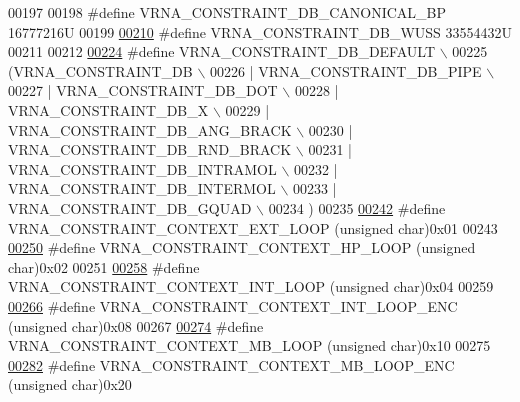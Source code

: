 \begin{DoxyCode}
00197 
00198 \textcolor{preprocessor}{#define VRNA\_CONSTRAINT\_DB\_CANONICAL\_BP         16777216U}
00199 
\hyperlink{group__hard__constraints_ga10ce6bd2355945f3c8161b7a30a2c322}{00210} \textcolor{preprocessor}{#define VRNA\_CONSTRAINT\_DB\_WUSS                 33554432U}
00211 
00212 
\hyperlink{group__hard__constraints_ga1c3864bdc92147a4d93de2b1b4356177}{00224} \textcolor{preprocessor}{#define VRNA\_CONSTRAINT\_DB\_DEFAULT \(\backslash\)}
00225 \textcolor{preprocessor}{  (VRNA\_CONSTRAINT\_DB \(\backslash\)}
00226 \textcolor{preprocessor}{   | VRNA\_CONSTRAINT\_DB\_PIPE \(\backslash\)}
00227 \textcolor{preprocessor}{   | VRNA\_CONSTRAINT\_DB\_DOT \(\backslash\)}
00228 \textcolor{preprocessor}{   | VRNA\_CONSTRAINT\_DB\_X \(\backslash\)}
00229 \textcolor{preprocessor}{   | VRNA\_CONSTRAINT\_DB\_ANG\_BRACK \(\backslash\)}
00230 \textcolor{preprocessor}{   | VRNA\_CONSTRAINT\_DB\_RND\_BRACK \(\backslash\)}
00231 \textcolor{preprocessor}{   | VRNA\_CONSTRAINT\_DB\_INTRAMOL \(\backslash\)}
00232 \textcolor{preprocessor}{   | VRNA\_CONSTRAINT\_DB\_INTERMOL \(\backslash\)}
00233 \textcolor{preprocessor}{   | VRNA\_CONSTRAINT\_DB\_GQUAD \(\backslash\)}
00234 \textcolor{preprocessor}{  )}
00235 
\hyperlink{group__hard__constraints_ga9418eda62a5dec070896702c279d2548}{00242} \textcolor{preprocessor}{#define VRNA\_CONSTRAINT\_CONTEXT\_EXT\_LOOP      (unsigned char)0x01}
00243 
\hyperlink{group__hard__constraints_ga79203702b197b6b9d3b78eed40663eb1}{00250} \textcolor{preprocessor}{#define VRNA\_CONSTRAINT\_CONTEXT\_HP\_LOOP       (unsigned char)0x02}
00251 
\hyperlink{group__hard__constraints_ga21feeab3a9e5fa5a9e3d9ac0fcf5994f}{00258} \textcolor{preprocessor}{#define VRNA\_CONSTRAINT\_CONTEXT\_INT\_LOOP      (unsigned char)0x04}
00259 
\hyperlink{group__hard__constraints_ga0536288e04ff6332ecdc23ca4705402b}{00266} \textcolor{preprocessor}{#define VRNA\_CONSTRAINT\_CONTEXT\_INT\_LOOP\_ENC  (unsigned char)0x08}
00267 
\hyperlink{group__hard__constraints_ga456ecd2ff00056bb64da8dd4f61bbfc5}{00274} \textcolor{preprocessor}{#define VRNA\_CONSTRAINT\_CONTEXT\_MB\_LOOP       (unsigned char)0x10}
00275 
\hyperlink{group__hard__constraints_ga02a3d703ddbcfce393e4bbfcb9db7077}{00282} \textcolor{preprocessor}{#define VRNA\_CONSTRAINT\_CONTEXT\_MB\_LOOP\_ENC   (unsigned char)0x20}

\end{DoxyCode}
